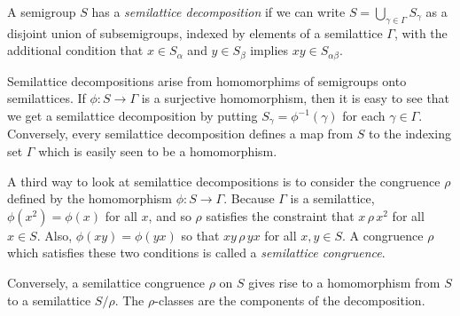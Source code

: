 \documentclass[12pt]{article}
\begin{document}
A semigroup $S$ has a \emph{semilattice decomposition} if we can write $S = \bigcup_{\gamma \in \Gamma}S_\gamma$ as a disjoint union of subsemigroups, indexed by elements of a semilattice $\Gamma$, with the additional condition that $x \in S_\alpha$ and $y \in S_\beta$ implies $xy \in S_{\alpha\beta}$.

Semilattice decompositions arise from homomorphims of semigroups onto semilattices.  If $\phi \colon S \to \Gamma$ is a surjective homomorphism, then it is easy to see that we get a semilattice decomposition by putting $S_\gamma = \phi^{-1}(\gamma)$ for each $\gamma \in \Gamma$.  Conversely, every semilattice decomposition defines a map from $S$ to the indexing set $\Gamma$ which is easily seen to be a homomorphism.

A third way to look at semilattice decompositions is to consider the congruence $\rho$ defined by the homomorphism $\phi \colon S \to \Gamma$.  Because $\Gamma$ is a semilattice, $\phi(x^2) = \phi(x)$ for all $x$, and so $\rho$ satisfies the constraint that $x \,\rho\, x^2$ for all $x \in S$.  Also, $\phi(xy) = \phi(yx)$ so that $xy \,\rho\, yx$ for all $x, y \in S$.
A congruence $\rho$ which satisfies these two conditions is called a \emph{semilattice congruence}.

Conversely, a semilattice congruence $\rho$ on $S$ gives rise to a homomorphism from $S$ to a semilattice $S/\rho$.  The $\rho$-classes are the components of the decomposition.
\end{document}
